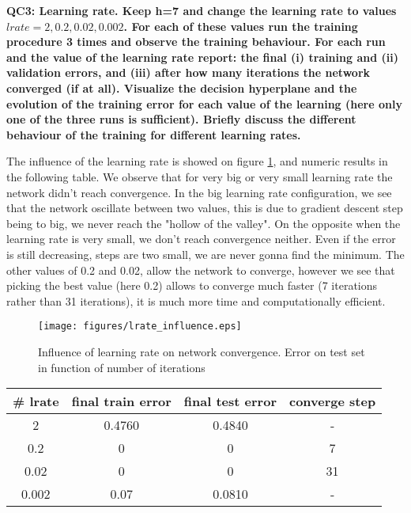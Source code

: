 \documentclass[a4paper,11pt]{exam}
\begin{document}
\textbf{QC3: Learning rate. Keep h=7 and change the learning rate to values $lrate = {2, 0.2, 0.02, 0.002}$. For each of these values run the training procedure 3 times and observe the training behaviour. For each run and the value of the learning rate report: the final (i) training and (ii) validation errors, and (iii) after how many iterations the network converged (if at all). Visualize the decision hyperplane and the evolution of the training error for each value of the learning (here only one of the three runs is sufficient). Briefly discuss the different behaviour of the training for different learning rates.\\}

The influence of the learning rate is showed on figure \ref{lrate_influence}, and numeric results in the following table. We observe that for very big or very small learning rate the network didn't reach convergence. In the big learning rate configuration, we see that the network oscillate between two values, this is due to gradient descent step being to big, we never reach the "hollow of the valley". On the opposite when the learning rate is very small, we don't reach convergence neither. Even if the error is still decreasing, steps are two small, we are never gonna find the minimum. The other values of 0.2 and 0.02, allow the network to converge, however we see that picking the best value (here 0.2) allows to converge much faster (7 iterations rather than 31 iterations), it is much more time and computationally efficient.

\begin{figure}[!h]
\centering
\texttt{[image: figures/lrate\_influence.eps]}
\caption{Influence of learning rate on network convergence. Error on test set in function of number of iterations}    
\label{lrate_influence}
\end{figure}


\begin{center}
\begin{tabular}{c |  c | c | c }
	\# lrate & final train error & final test error & converge step \\
	\hline
	   2 & 0.4760 & 0.4840 & - \\
           0.2 & 0 & 0 & 7\\
           0.02 & 0 & 0 & 31\\
           0.002 & 0.07 & 0.0810 & -\\
	 \hline
\end{tabular}
\end{center}
\end{document}
